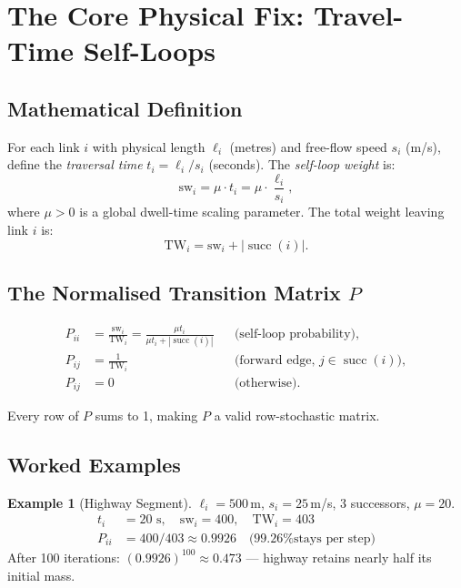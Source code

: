 \documentclass[12pt,a4paper]{article}
\theoremstyle{definition}
\newtheorem{example}{Example}[section]
\theoremstyle{plain}
\newcommand{\sw}{\mathrm{sw}}
\newcommand{\TW}{\mathrm{TW}}
\begin{document}
\section{The Core Physical Fix: Travel-Time Self-Loops}
\label{sec:selfloop}

\subsection{Mathematical Definition}

For each link $i$ with physical length $\ell_i$ (metres) and free-flow speed $s_i$
(m/s), define the \emph{traversal time} $t_i = \ell_i / s_i$ (seconds). The
\emph{self-loop weight} is:
\begin{equation}
  \boxed{\sw_i = \mu \cdot t_i = \mu \cdot \frac{\ell_i}{s_i}},
  \label{eq:selfloop}
\end{equation}
where $\mu > 0$ is a global dwell-time scaling parameter. The total weight leaving
link $i$ is:
\[
  \TW_i = \sw_i + |\operatorname{succ}(i)|.
\]

\subsection{The Normalised Transition Matrix $P$}

\begin{align}
  P_{ii} &= \frac{\sw_i}{\TW_i} = \frac{\mu t_i}{\mu t_i + |\operatorname{succ}(i)|}
  & &\text{(self-loop probability)},\\[4pt]
  P_{ij} &= \frac{1}{\TW_i}
  & &\text{(forward edge, } j \in \operatorname{succ}(i)\text{)},\\[4pt]
  P_{ij} &= 0 & &\text{(otherwise).}
\end{align}

Every row of $P$ sums to 1, making $P$ a valid row-stochastic matrix.

\subsection{Worked Examples}

\begin{example}[Highway Segment]
  $\ell_i = 500$\,m, $s_i = 25$\,m/s, 3 successors, $\mu = 20$.
  \begin{align*}
    t_i &= 20\text{ s}, \quad \sw_i = 400, \quad \TW_i = 403\\
    P_{ii} &= 400/403 \approx \mathbf{0.9926} \quad \text{(99.26\% stays per step)}
  \end{align*}
  After 100 iterations: $(0.9926)^{100} \approx 0.473$ --- highway retains nearly half its
  initial mass.
\end{example}
\end{document}
